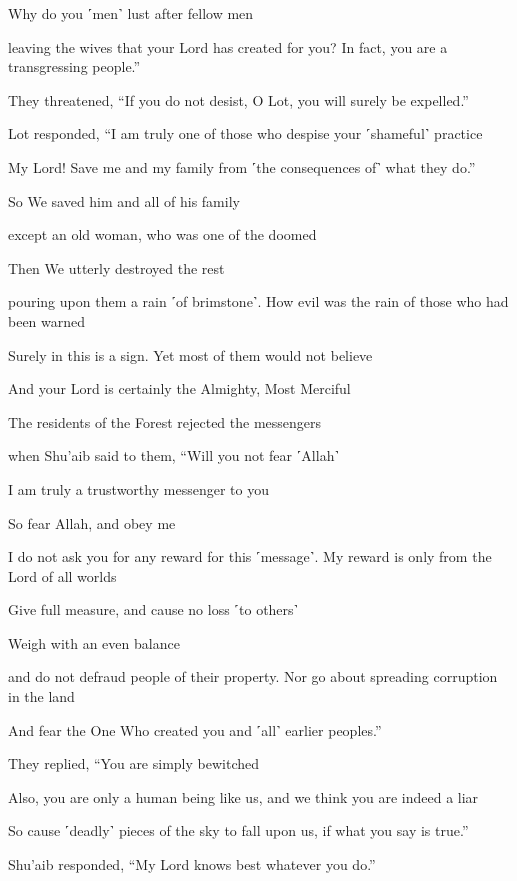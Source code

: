 Why do you ˹men˺ lust after fellow men

leaving the wives that your Lord has created for you? In fact, you are a transgressing people.”

They threatened, “If you do not desist, O Lot, you will surely be expelled.”

Lot responded, “I am truly one of those who despise your ˹shameful˺ practice

My Lord! Save me and my family from ˹the consequences of˺ what they do.”

So We saved him and all of his family

except an old woman, who was one of the doomed

Then We utterly destroyed the rest

pouring upon them a rain ˹of brimstone˺. How evil was the rain of those who had been warned

Surely in this is a sign. Yet most of them would not believe

And your Lord is certainly the Almighty, Most Merciful

The residents of the Forest rejected the messengers

when Shu’aib said to them, “Will you not fear ˹Allah˺

I am truly a trustworthy messenger to you

So fear Allah, and obey me

I do not ask you for any reward for this ˹message˺. My reward is only from the Lord of all worlds

Give full measure, and cause no loss ˹to others˺

Weigh with an even balance

and do not defraud people of their property. Nor go about spreading corruption in the land

And fear the One Who created you and ˹all˺ earlier peoples.”

They replied, “You are simply bewitched

Also, you are only a human being like us, and we think you are indeed a liar

So cause ˹deadly˺ pieces of the sky to fall upon us, if what you say is true.”

Shu’aib responded, “My Lord knows best whatever you do.”

